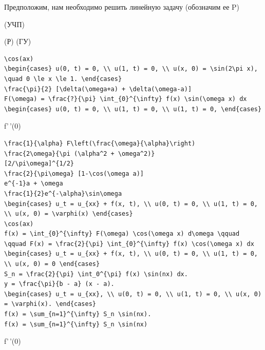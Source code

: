 \documentclass[
  ukrainian,
]{article}
\begin{document}
Предположим, нам необходимо решить линейную задачу (обозначим ее P)

(УЧП)

(Р) (ГУ)

\begin{verbatim}
\cos(ax)
\begin{cases} u(0, t) = 0, \\ u(1, t) = 0, \\ u(x, 0) = \sin(2\pi x), \quad 0 \le x \le 1. \end{cases}
\frac{\pi}{2} [\delta(\omega+a) + \delta(\omega-a)]
F(\omega) = \frac{?}{\pi} \int_{0}^{\infty} f(x) \sin(\omega x) dx
\begin{cases} u(0, t) = 0, \\ u(1, t) = 0, \\ u(1, t) = 0, \end{cases}
\end{verbatim}

f'\,'(0)

\begin{verbatim}
\frac{1}{\alpha} F\left(\frac{\omega}{\alpha}\right)
\frac{2\omega}{\pi (\alpha^2 + \omega^2)}
[2/\pi\omega]^{1/2}
\frac{2}{\pi\omega} [1-\cos(\omega a)]
e^{-1}a + \omega
\frac{1}{2}e^{-\alpha}\sin\omega
\begin{cases} u_t = u_{xx} + f(x, t), \\ u(0, t) = 0, \\ u(1, t) = 0, \\ u(x, 0) = \varphi(x) \end{cases}
\cos(ax)
f(x) = \int_{0}^{\infty} F(\omega) \cos(\omega x) d\omega \qquad \qquad F(x) = \frac{2}{\pi} \int_{0}^{\infty} f(x) \cos(\omega x) dx
\begin{cases} u_t = u_{xx} + f(x, t), \\ u(0, t) = 0, \\ u(1, t) = 0, \\ u(x, 0) = 0 \end{cases}
S_n = \frac{2}{\pi} \int_0^{\pi} f(x) \sin(nx) dx.
y = \frac{\pi}{b - a} (x - a).
\begin{cases} u_t = u_{xx}, \\ u(0, t) = 0, \\ u(1, t) = 0, \\ u(x, 0) = \varphi(x). \end{cases}
f(x) = \sum_{n=1}^{\infty} S_n \sin(nx).
f(x) = \sum_{n=1}^{\infty} S_n \sin(nx)
\end{verbatim}

f'\,'(0)
\end{document}
